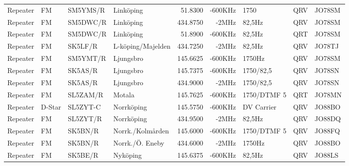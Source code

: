 \begin{landscape}
\begin{longtable}{llllrrlcl}
	Repeater          & FM           & SM5YMS/R      & Linköping         &           51.8300 &        -600KHz & 1750            &       QRV       & JO78SM           \\
	Repeater          & FM           & SM5DWC/R      & Linköping         &          434.8750 &          -2MHz & 82,5Hz          &       QRV       & JO78SM           \\
	Repeater          & FM           & SM5DWC/R      & Linköping         &           51.8900 &        -600KHz & 82,5Hz          &       QRT       & JO78SM           \\
	Repeater          & FM           & SK5LF/R       & L-köping/Majelden &          434.7250 &          -2MHz & 82,5Hz          &       QRV       & JO78TJ           \\
	Repeater          & FM           & SM5YMT/R      & Ljungsbro         &          145.6625 &        -600KHz & 1750Hz          &       QRV       & JO78SM           \\
	Repeater          & FM           & SK5AS/R       & Ljungsbro         &          145.7375 &        -600KHz & 1750/82,5       &       QRV       & JO78SN           \\
	Repeater          & FM           & SK5AS/R       & Ljungsbro         &          434.9000 &          -2MHz & 1750/82,5       &       QRV       & JO78SN           \\
	Repeater          & FM           & SL5ZAM/R      & Motala            &          145.7625 &        -600KHz & 1750/DTMF 5     &       QRT       & JO78MN           \\
	Repeater          & D-Star       & SL5ZYT-C      & Norrköping        &          145.5750 &        -600KHz & DV Carrier      &       QRV       & JO88BO           \\
	Repeater          & FM           & SL5ZYT/R      & Norrköping        &          434.9500 &          -2MHz & 82,5Hz          &       QRV       & JO88DQ           \\
	Repeater          & FM           & SK5BN/R       & Norrk./Kolmården  &          145.6000 &        -600KHz & 1750/DTMF 5     &       QRV       & JO88FQ           \\
	Repeater          & FM           & SK5BN/R       & Norrk./Ö. Eneby   &          434.6000 &          -2MHz & 1750Hz          &       QRV       & JO88BO           \\
	Repeater          & FM           & SK5BE/R       & Nyköping          &          145.6375 &        -600KHz & 82,5Hz          &       QRV       & JO88LS           \\

\end{longtable}
\end{landscape}

